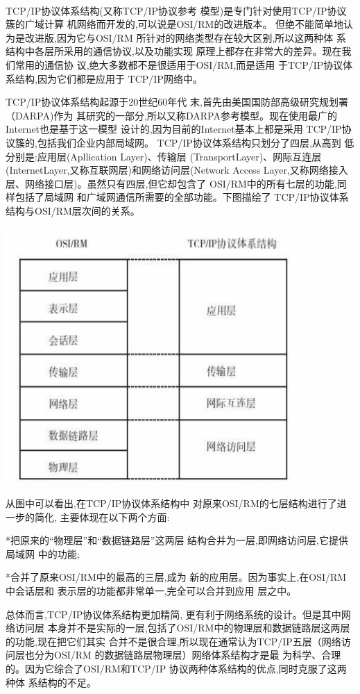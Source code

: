 \documentclass[11pt]{ctexart} %
\begin{document}
\paragraph{}
TCP/IP协议体系结构(又称TCP/IP协议参考
模型)是专门针对使用TCP/IP协议簇的广域计算
机网络而开发的,可以说是OSI/RM的改进版本。
但绝不能简单地认为是改进版,因为它与OSI/RM
所针对的网络类型存在较大区别,所以这两种体
系结构中各层所采用的通信协议,以及功能实现
原理上都存在非常大的差异。现在我们常用的通信协
议,绝大多数都不是很适用于OSI/RM,而是适用
于TCP/IP协议体系结构,因为它们都是应用于
TCP/IP网络中。

TCP/IP协议体系结构起源于20世纪60年代
末,首先由美国国防部高级研究规划署（DARPA)作为
其研究的一部分,所以又称DARPA参考模型。现在使用最广的Internet也是基于这一模型
设计的,因为目前的Internet基本上都是采用
TCP/IP协议簇的,包括我们企业内部局域网。
TCP/IP协议体系结构只划分了四层,从高到
低分别是:应用层(Apllication Layer)、传输层
(TransportLayer)、网际互连层(InternetLayer,又称互联网层)和网络访问层(Network
Access Layer,又称网络接入层、网络接口层)。虽然只有四层,但它却包含了
OSI/RM中的所有七层的功能,同样包括了局域网
和广域网通信所需要的全部功能。下图描绘了
TCP/IP协议体系结构与OSI/RM层次间的关系。

\includegraphics[width=0.7\linewidth]{OSI&TCP}

从图中可以看出,在TCP/IP协议体系结构中
对原来OSI/RM的七层结构进行了进一步的简化,
主要体现在以下两个方面:

*把原来的“物理层”和“数据链路层”这两层
结构合并为一层,即网络访问层,它提供局域网
中的功能;

*合并了原来OSI/RM中的最高的三层,成为
新的应用层。因为事实上,在OSI/RM中会话层和
表示层的功能都非常单一,完全可以合并到应用
层之中。


总体而言,TCP/IP协议体系结构更加精简,
更有利于网络系统的设计。但是其中网络访问层
本身并不是实际的一层,包括了OSI/RM中的物理层和数据链路层这两层的功能,现在把它们其实
合并不是很合理,所以现在通常认为TCP/IP五层（网络访问层也分为OSI/RM 的数据链路层物理层）网络体系结构才是最
为科学、合理的。因为它综合了OSI/RM和TCP/IP
协议两种体系结构的优点,同时克服了这两种体
系结构的不足。
\end{document}
